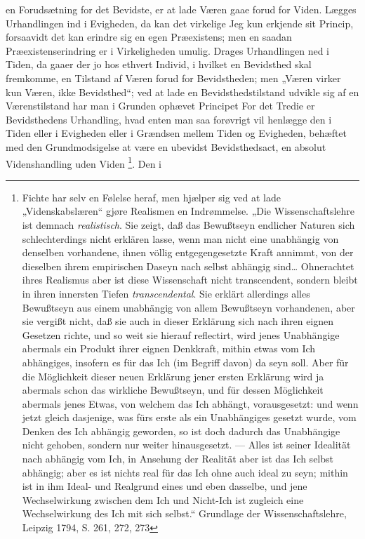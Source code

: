 \documentclass[11pt]{book}
\newcommand{\opage}[1]{\marginnote{\footnotesize\textit{[#1]}}}
\begin{document}
\opage{34} \setcounter{footnote}{0}%
en Forudsætning for det Bevidste, er at lade Væren gaae forud for
Viden. Lægges Urhandlingen ind i Evigheden, da kan det virkelige Jeg
kun erkjende sit Princip, forsaavidt det kan erindre sig en egen
Præexistens; men en saadan Præexistenserindring er i Virkeligheden
umulig. Drages Urhandlingen ned i Tiden, da gaaer der jo hos ethvert
Individ, i hvilket en Bevidsthed skal fremkomme, en Tilstand af Væren
forud for Bevidstheden; men „Væren virker kun Væren, ikke
Bevidsthed“; ved at lade en Bevidsthedstilstand udvikle sig af en
Værenstilstand har man i Grunden ophævet Principet
For det Tredie er Bevidsthedens Urhandling, hvad enten man saa
forøvrigt vil henlægge den i Tiden eller i Evigheden eller i Grændsen
mellem Tiden og Evigheden, behæftet med den Grundmodsigelse at være en
ubevidst Bevidsthedsact, en absolut Videnshandling uden Viden%
\footnote{Fichte har selv en Følelse heraf, men hjælper sig ved at lade
„Videnskabslæren“ gjøre Realismen en Indrømmelse. „Die
Wissenschaftslehre ist demnach \emph{realistisch}. Sie zeigt, daß das
Bewußtseyn endlicher Naturen sich schlechterdings nicht erklären
lasse, wenn man nicht eine unabhängig von denselben vorhandene, ihnen
völlig entgegengesetzte Kraft annimmt, von der dieselben ihrem
empirischen Daseyn nach selbst abhängig sind\dots{} Ohnerachtet ihres
Realismus aber ist diese Wissenschaft nicht transcendent, sondern
bleibt in ihren innersten Tiefen \emph{transcendental}. Sie erklärt
allerdings alles Bewußtseyn aus einem unabhängig von allem Bewußtseyn
vorhandenen, aber sie vergißt nicht, daß sie auch in dieser Erklärung
sich nach ihren eignen Gesetzen richte, und so weit sie hierauf
reflectirt, wird jenes Unabhängige abermals ein Produkt ihrer eignen
Denkkraft, mithin etwas vom Ich abhängiges, insofern es für das Ich
(im Begriff davon) da seyn soll. Aber für die Möglichkeit dieser neuen
Erklärung jener ersten Erklärung wird ja abermals schon das wirkliche
Bewußtseyn, und für dessen Möglichkeit abermals jenes Etwas, von
welchem das Ich abhängt, vorausgesetzt: und wenn jetzt gleich
dasjenige, was fürs erste als ein Unabhängiges gesetzt wurde, vom
Denken des Ich abhängig%
{} geworden, so ist doch dadurch das Unabhängige nicht gehoben,
sondern nur weiter hinausgesetzt. --- Alles ist seiner Idealität nach
abhängig vom Ich, in Ansehung der Realität aber ist das Ich selbst
abhängig; aber es ist nichts real für das Ich ohne auch ideal zu seyn;
mithin ist in ihm Ideal- und Realgrund eines und eben dasselbe, und
jene Wechselwirkung zwischen dem Ich und Nicht-Ich ist zugleich eine
Wechselwirkung des Ich mit sich selbst.“ Grundlage der
Wissenschaftslehre, Leipzig 1794, S. 261, 272, 273}. Den i
\end{document}
